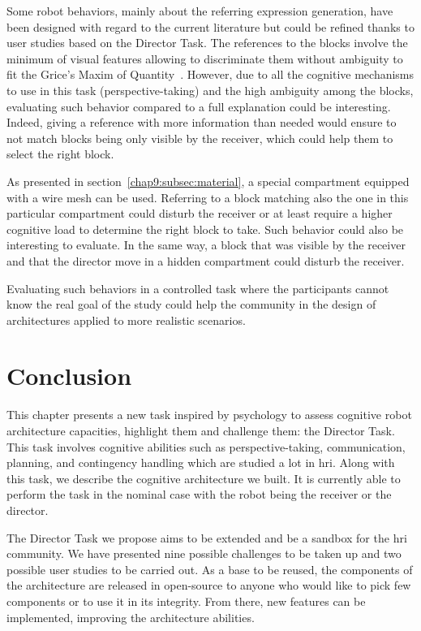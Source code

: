 \documentclass[a4paper,11pt,twoside]{StyleThese}
\begin{document}
Some robot behaviors, mainly about the referring expression generation, have been designed with regard to the current literature but could be refined thanks to user studies based on the Director Task. The references to the blocks involve the minimum of visual features allowing to discriminate them without ambiguity to fit the Grice's Maxim of Quantity~\citep{grice_1975_logic}. However, due to all the cognitive mechanisms to use in this task (\eg perspective-taking) and the high ambiguity among the blocks, evaluating such behavior compared to a full explanation could be interesting. Indeed, giving a reference with more information than needed would ensure to not match blocks being only visible by the receiver, which could help them to select the right block.

As presented in section~\ref{chap9:subsec:material}, a special compartment equipped with a wire mesh can be used. Referring to a block matching also the one in this particular compartment could disturb the receiver or at least require a higher cognitive load to determine the right block to take. Such behavior could also be interesting to evaluate. In the same way, a block that was visible by the receiver and that the director move in a hidden compartment could disturb the receiver.

Evaluating such behaviors in a controlled task where the participants cannot know the real goal of the study could help the community in the design of architectures applied to more realistic scenarios.

\section{Conclusion}
This chapter presents a new task inspired by psychology to assess cognitive robot architecture capacities, highlight them and challenge them: the Director Task. This task involves cognitive abilities such as perspective-taking, communication, planning, and contingency handling which are studied a lot in \acrshort{hri}. Along with this task, we describe the cognitive architecture we built. It is currently able to perform the task in the nominal case with the robot being the receiver or the director. 

The Director Task we propose aims to be extended and be a sandbox for the \acrshort{hri} community. We have presented nine possible challenges to be taken up and two possible user studies to be carried out. As a base to be reused, the components of the architecture are released in open-source to anyone who would like to pick few components or to use it in its integrity. From there, new features can be implemented, improving the architecture abilities.

\ifdefined{}
\else


\end{document}
